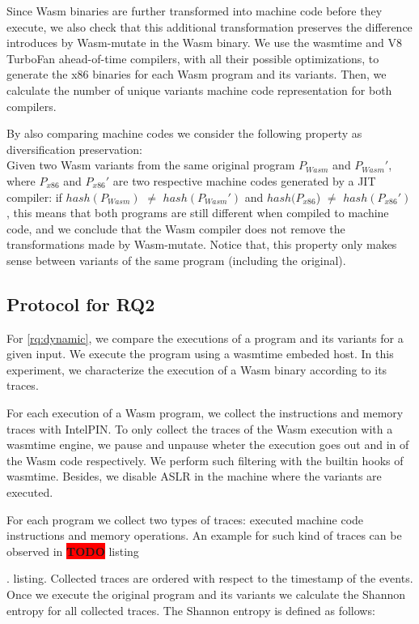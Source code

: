 \documentclass[sigplan,screen]{acmart}
\newcommand*\badge[1]{ \colorbox{red}{\color{white}#1}}
\newcommand{\tool}{Wasm-mutate\xspace}
\newcommand{\wasm}{Wasm\xspace}
\newcommand{\todo}[1]{%
\refstepcounter{todo}
\noindent\textbf{\badge{TODO}} {\color{red}#1}
\addcontentsline{td}{todo}
{\color{red}\thesection.\thetodo\xspace #1}}
\begin{document}
Since \wasm binaries are further transformed into machine code before they execute, we also check that this additional transformation preserves the difference introduces by \tool in the \wasm binary. 
We use the wasmtime and V8 TurboFan ahead-of-time compilers, with all their possible optimizations, to generate the x86 binaries for each \wasm program and its variants. 
Then, we calculate the number of unique variants machine code representation for both compilers.

By also comparing machine codes we consider the following property as diversification preservation: \\
Given two \wasm variants from the same original program $P_{Wasm}$ and $P_{Wasm}'$, where $P_{x86}$ and $P_{x86}'$ are two respective machine codes generated by a JIT compiler:
if $hash(P_{Wasm})$ $\neq$ $hash(P_{Wasm}')$ and $hash(P_{x86}$) $\neq$ $hash(P_{x86}')$, this means that  both programs are still different when compiled to machine code, and we conclude that the \wasm compiler does not remove the transformations made by \tool.  Notice that, this property only makes sense between variants of the same program (including the original).




\subsection{Protocol for RQ2}

For \ref{rq:dynamic}, we compare  the executions of a program and its variants for a given input. 
We execute the program using a wasmtime embeded host.
In this experiment, we characterize the  execution of a \wasm binary according to its traces.


For each execution of a \wasm program, we collect the instructions and memory traces with IntelPIN. 
To only collect the traces of the Wasm execution with a wasmtime engine, we pause and unpause wheter the execution goes out and in of the Wasm code respectively.
We perform such filtering with the builtin hooks of wasmtime.
Besides, we disable ASLR in the machine where the variants are executed.

For each program we collect two types of traces: executed machine code instructions and memory operations.
An example for such kind of traces can be observed in \todo{listing}.
Collected traces are ordered with respect to the timestamp of the events. 
Once we execute the original program and its variants we calculate the Shannon entropy \cite{shannon} for all collected traces.
The Shannon entropy is defined as follows:
\end{document}

